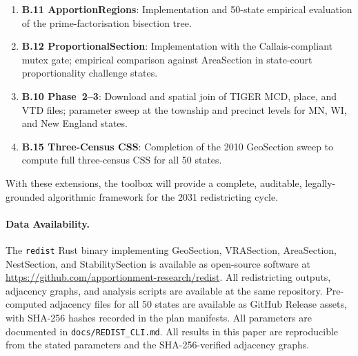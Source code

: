 \begin{enumerate}
  \item \textbf{B.11 ApportionRegions}: Implementation and 50-state empirical
    evaluation of the prime-factorisation bisection tree.
  \item \textbf{B.12 ProportionalSection}: Implementation with the
    Callais-compliant mutex gate; empirical comparison against AreaSection
    in state-court proportionality challenge states.
  \item \textbf{B.10 Phase~2--3}: Download and spatial join of TIGER MCD, place,
    and VTD files; parameter sweep at the township and precinct levels for
    MN, WI, and New England states.
  \item \textbf{B.15 Three-Census CSS}: Completion of the 2010 GeoSection sweep
    to compute full three-census CSS for all 50 states.
\end{enumerate}

With these extensions, the toolbox will provide a complete, auditable,
legally-grounded algorithmic framework for the 2031 redistricting cycle.

\paragraph{Data Availability.}
The \texttt{redist} Rust binary implementing GeoSection, VRASection,
AreaSection, NestSection, and StabilitySection is available as open-source
software at \url{https://github.com/apportionment-research/redist}.
All redistricting outputs, adjacency graphs, and analysis scripts are available
at the same repository.
Pre-computed adjacency files for all 50 states are available as GitHub Release assets,
with SHA-256 hashes recorded in the plan manifests.
All parameters are documented in \texttt{docs/REDIST\_CLI.md}.
All results in this paper are reproducible from the stated parameters and the
SHA-256-verified adjacency graphs.

